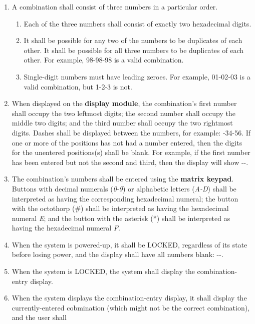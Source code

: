 \begin{enumerate}
\item A combination shall consist of three numbers in a particular order.
    \begin{enumerate}
    \item Each of the three numbers shall consist of exactly two hexadecimal
        digits.
    \item It shall be possible for any two of the numbers to be duplicates of
        each other. It shall be possible for all three numbers to be duplicates
        of each other. For example, 98-98-98 is a valid combination.
    \item Single-digit numbers must have leading zeroes. For example,
        01-02-03 is a valid combination, but 1-2-3 is not.
    \end{enumerate}
\item When displayed on the \textbf{display module}, the combination's first
    number shall occupy the two leftmost digits; the second number shall occupy
    the middle two digits; and the third number shall occupy the two rightmost
    digits. Dashes shall be displayed between the numbers, for example:
    {-34-56}. If one or more of the positions has not had a number
    entered, then the digits for the unentered positions(s) shall be blank.
    For example, if the first number has been entered but not the second and
    third, then the display will show {-\phantom{88}-\phantom{88}}.
\item The combination's numbers shall be entered using the \textbf{matrix
    keypad}. Buttons with decimal numerals (\textit{0-9}) or alphabetic letters
    (\textit{A-D}) shall be interpreted as having the corresponding hexadecimal
    numeral; the button with the octothorp (\#) shall be interpreted as having
    the hexadecimal numeral \textit{E}; and the button with the asterisk (*)
    shall be interpreted as having the hexadecimal numeral \textit{F}.
\item When the system is powered-up, it shall be LOCKED, regardless of its state
    before losing power, and the display shall have all numbers blank:
    {\dviiseg \phantom{88}-\phantom{88}-\phantom{88}}.
\item When the system is LOCKED, the system shall display the combination-entry
    display.
\item \label{spec:enterCombination} When the system displays the
    combination-entry display, it shall display the currently-entered
    cobmination (which might not be the correct combination), and the user shall

\end{enumerate}
